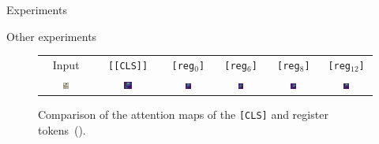 \documentclass[aspectratio=169]{beamer}
\begin{document}
\begin{section}{Experiments}
\begin{subsection}{Other experiments}
\begin{frame}
\begin{figure}[t]
    \begin{tabular}{cccccc}
      Input & \texttt{[\texttt{[CLS]}]} & \texttt{[reg$_0$]} & \texttt{[reg$_6$]} & \texttt{[reg$_8$]} & \texttt{[reg$_{12}$]} \\
      \includegraphics[width=0.13\textwidth]{resources/230913_fig_slot_attn/mug.png} &
      \includegraphics[width=0.13\textwidth]{resources/230913_fig_slot_attn/mug_attn_cls.png} &
      \includegraphics[width=0.13\textwidth]{resources/230913_fig_slot_attn/mug_attn_reg_0.png} &
      \includegraphics[width=0.13\textwidth]{resources/230913_fig_slot_attn/mug_attn_reg_6.png} &
      \includegraphics[width=0.13\textwidth]{resources/230913_fig_slot_attn/mug_attn_reg_8.png} &
      \includegraphics[width=0.13\textwidth]{resources/230913_fig_slot_attn/mug_attn_reg_12.png}
      \\
    \end{tabular}
    \caption{
      Comparison of the attention maps of the \texttt{[CLS]} and register tokens~(\cite{darcetVisionTransformersNeed2024}).
    }
    \label{fig:slot_attn}
\end{figure}

\end{frame}

\end{subsection}

\end{section}
\end{document}
